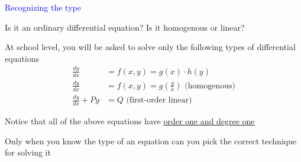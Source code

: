 \documentclass[14pt,fleqn]{extarticle}
\begin{document}
\begin{skill}
\begin{narrow}
\textcolor{blue}{Recognizing the type}

Is it an ordinary differential equation?
Is it homogenous or linear? 
\end{narrow}

%

\reason

At school level, you will be asked 
to solve only the following types of
differential equations 
% 
\begin{align}
\frac{dy}{dx} &= f(x,y) = g(x)\cdot h(y) \\
\frac{dy}{dx} &= f(x,y) = g\left(\frac{y}{x}\right)\text{ (homogenous)} \\
\frac{dy}{dx} + Py &= Q  \text{ (first-order linear)}
\end{align}\newline 

Notice that all of the above equations
have \underline{order one and degree one}\newline 

Only when you know the type of an equation can you pick the correct technique for solving it
%

\end{skill}
\end{document}
